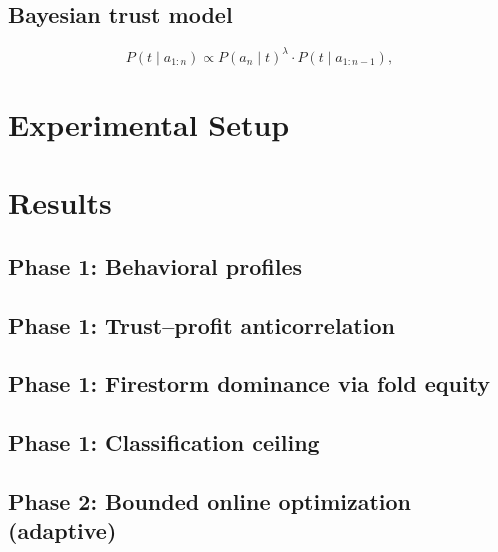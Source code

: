 \documentclass[11pt]{article}
\begin{document}
\subsection{Bayesian trust model}
\[
  P(t \mid a_{1:n}) \propto P(a_n \mid t)^\lambda \cdot P(t \mid a_{1:n-1}),
\]

\section{Experimental Setup}
\label{sec:setup}


\section{Results}
\label{sec:results}

\subsection{Phase 1: Behavioral profiles}

\subsection{Phase 1: Trust--profit anticorrelation}

\subsection{Phase 1: Firestorm dominance via fold equity}

\subsection{Phase 1: Classification ceiling}

\subsection{Phase 2: Bounded online optimization (adaptive)}
\end{document}
